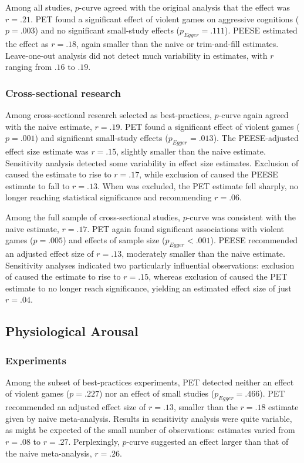 \documentclass[man]{apa6}
\begin{document}
Among all studies, $p$-curve agreed with the original analysis that the effect was $r = .21$. PET found a significant effect of violent games on aggressive cognitions ($p = .003$) and no significant small-study effects ($p_{Egger} = .111$). PEESE estimated the effect as $r = .18$, again smaller than the naive or trim-and-fill estimates. Leave-one-out analysis did not detect much variability in estimates, with $r$ ranging from $.16$ to $.19$. 

\subsubsection{Cross-sectional research}
Among cross-sectional research selected as best-practices, $p$-curve again agreed with the naive estimate, $r = . 19$. PET found a significant effect of violent games ($p = .001$) and significant small-study effects ($p_{Egger} = .013$). The PEESE-adjusted effect size estimate was $r = .15$, slightly smaller than the naive estimate. Sensitivity analysis detected some variability in effect size estimates. Exclusion of \citet{Yukawa:Sakamoto:2001} caused the estimate to rise to $r = .17$, while exclusion of \citet{Funk:etal:2003} caused the PEESE estimate to fall to $r = .13$. When \citet{Anderson:etal:2004} was excluded, the PET estimate fell sharply, no longer reaching statistical significance and recommending $r = .06$.

Among the full sample of cross-sectional studies, $p$-curve was consistent with the naive estimate, $r = .17$. PET again found significant associations with violent games ($p = .005$) and effects of sample size ($p_{Egger} < .001$). PEESE recommended an adjusted effect size of $r = .13$, moderately smaller than the naive estimate. Sensitivity analyses indicated two particularly influential observations: exclusion of \citet{Santisteban:etal:2007} caused the estimate to rise to $r = .15$, whereas exclusion of \citet{Funk:etal:2003} caused the PET estimate to no longer reach significance, yielding an estimated effect size of just $r = .04$.

\subsection{Physiological Arousal}
\subsubsection{Experiments}
Among the subset of best-practices experiments, PET detected neither an effect of violent games ($p = .227$) nor an effect of small studies ($p_{Egger} = .466$). PET recommended an adjusted effect size of $r = .13$, smaller than the $r = .18$ estimate given by naive meta-analysis. Results in sensitivity analysis were quite variable, as might be expected of the small number of observations: estimates varied from $r = .08$ to $r = .27$. Perplexingly, $p$-curve suggested an effect larger than that of the naive meta-analysis, $r = .26$.
\end{document}
